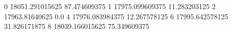 0 18051.291015625 87.474609375
1 17975.099609375 11.283203125
2 17963.81640625 0.0
4 17976.083984375 12.267578125
6 17995.642578125 31.826171875
8 18039.166015625 75.349609375
